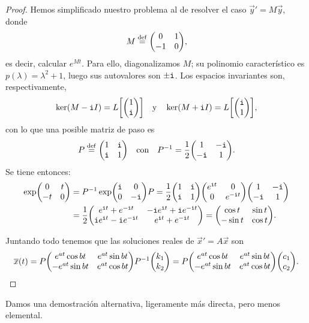 \documentclass[../ecuaciones_diferenciales.tex]{subfiles}
\begin{document}
\begin{proof}
	Hemos simplificado nuestro problema al de resolver el caso 
	\(\vec{y}' = M\vec{y}\), donde
	\[M \eqdef \mat{0 & 1 \\ -1 & 0},\]
	es decir, calcular \(e^{Mt}\).
	Para ello, diagonalizamos \(M\); su polinomio característico es 
	\(p(\lambda) = \lambda^2 + 1\), luego sus
	autovalores son \(\pm \mathtt{i}\). Los espacios invariantes son, respectivamente,
	\[\ker(M - \iu I) = L\left[\mat{1 \\ \iu}\right] 
		\quad \text{y} \quad 
		\ker(M + \iu I) = L\left[\mat{\iu \\ 1}\right],\]
	con lo que una posible matriz de paso es 
	\[P \eqdef \mat{1 & \iu \\ \iu & 1} \quad \text{con} \quad 
		P^{-1} = \frac{1}{2} \mat{1 & -\iu \\ -\iu & 1}.\]
	Se tiene entonces:
	\begin{align*}
		\exp \mat{0 & t \\ -t & 0} &= P^{-1} \exp\mat{\iu & 0 \\ 0 & -\iu} P =
		\frac{1}{2} \mat{1 & \iu \\ \iu & 1}
		\mat{e^{\iu t} & 0 \\ 0 & e^{-\iu t}} \mat {1 & -\iu \\ -\iu & 1} \\
		&= \frac{1}{2} 
		\mat{e^{\iu t} + e^{-\iu t} & -\iu e^{\iu t} + \iu e^{-\iu t} \\
		\iu e^{\iu t} - \iu e^{-\iu t} & e^{\iu t} + e^{-\iu t}} 
		= \mat{\cos t & \sin t \\ -\sin t & \cos t}.
	\end{align*}

	Juntando todo tenemos que las soluciones reales de \(\vec{x}' = A\vec{x}\) 
	son
	\[\vec{x}(t) = P 
		\mat{e^{at}\cos bt & e^{at}\sin bt \\
			-e^{at} \sin bt & e^{at} \cos bt} P^{-1} 
		\mat{k_1 \\ k_2} 
		= P \mat{e^{at}\cos bt & e^{at}\sin bt \\
			-e^{at} \sin bt & e^{at} \cos bt} \mat {c_1 \\ c_2}.\]
\end{proof}

Damos una demostración alternativa, ligeramente más directa, pero menos 
elemental.
\end{document}
